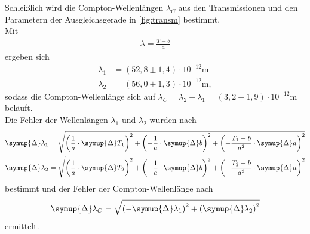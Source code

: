 \noindent Schleißlich wird die Compton-Wellenlängen $\lambda_C$ aus den Transmissionen und den Parametern der Ausgleichsgerade 
in \autoref{fig:transm} bestimmt. \\
Mit 
\begin{align*}
  \lambda = \frac{T-b}{a}
\end{align*}
ergeben sich
\begin{align*}
  \lambda_1 &= (52,8 \pm 1,4) \cdot 10^{-12}\unit{\meter} \\
  \lambda_2 &= (56,0 \pm 1,3) \cdot 10^{-12}\unit{\meter},
\end{align*}
sodass die Compton-Wellenlänge sich auf $\lambda_C = \lambda_2 - \lambda_1 = (3,2 \pm 1,9) \cdot 10^{-12}\unit{\meter}$ beläuft.\\
Die Fehler der Wellenlängen $\lambda_1$ und $\lambda_2$ wurden nach
\begin{align*}
  \symup{\Delta}\lambda_1 &= \sqrt{\left(\frac{1}{a}\cdot \symup{\Delta}T_1\right)^2 + \left(-\frac{1}{a}\cdot \symup{\Delta}b\right)^2 + \left(-\frac{T_1-b}{a^2}\cdot \symup{\Delta}a\right)^2} \\
  \symup{\Delta}\lambda_2 &= \sqrt{\left(\frac{1}{a}\cdot \symup{\Delta}T_2\right)^2 + \left(-\frac{1}{a}\cdot \symup{\Delta}b\right)^2 + \left(-\frac{T_2-b}{a^2}\cdot \symup{\Delta}a\right)^2}
\end{align*}
bestimmt und der Fehler der Compton-Wellenlänge nach
\begin{equation*}
  \symup{\Delta}\lambda_C = \sqrt{\left(-\symup{\Delta}\lambda_1\right)^2 + \left(\symup{\Delta}\lambda_2\right)^2}
\end{equation*}
ermittelt.